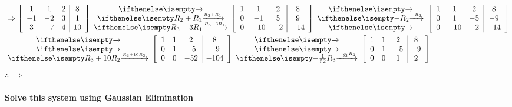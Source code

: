 \documentclass[
  letterpaper,
  DIV=11,
  numbers=noendperiod]{scrartcl}
\let\oldparagraph\paragraph
\renewcommand{\paragraph}[1]{\oldparagraph{#1}\mbox{}}
\begin{document}
\begin{equation*}
\begin{aligned}
&\Rightarrow \left[\begin{array}{ccc|c}1 & 1 & 2 & 8 \\ -1 & -2 & 3 & 1 \\ 3 & -7 & 4 & 10\end{array}\right] \rowops{,R_2+R_1,R_3-3R_1}\left[\begin{array}{ccc|c}1 & 1 & 2 & 8 \\ 0 & -1 & 5 & 9 \\ 0 & -10 & -2 & -14\end{array}\right] \rowops{,-R_2,} \left[\begin{array}{ccc|c}1 & 1 & 2 & 8 \\ 0 & 1 & -5 & -9 \\ 0 & -10 & -2 & -14\end{array}\right] \\
&\rowops{,,R_3+10R_2} \left[\begin{array}{ccc|c}1 & 1 & 2 & 8 \\ 0 & 1 & -5 & -9 \\ 0 & 0 & -52 & -104\end{array}\right]\rowops{,,-\frac{1}{52}R_3}\left[\begin{array}{ccc|c}1 & 1 & 2 & 8 \\ 0 & 1 & -5 & -9 \\ 0 & 0 & 1 & 2\end{array}\right]
\end{aligned}
\end{equation*} \(\therefore\)
 \(\Rightarrow\)

\hypertarget{solve-this-system-using-gaussian-elimination-1}{%
\paragraph{Solve this system using Gaussian
Elimination}\label{solve-this-system-using-gaussian-elimination-1}}

\end{document}
